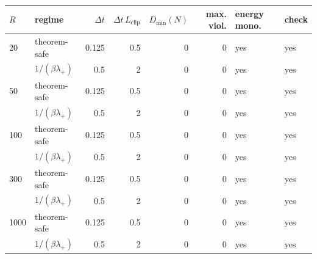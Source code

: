 \begin{tabular}{llrrrrll}
\toprule
$R$ & regime & $\Delta t$ & $\Delta t\,L_{\mathrm{clip}}$ & $D_{\min}(N)$ & max. viol. & energy mono. & check \\
\midrule
20 & theorem-safe & 0.125 & 0.5 & 0 & 0 & yes & yes \\
 & $1/(\beta\lambda_+)$ & 0.5 & 2 & 0 & 0 & yes & yes \\
\midrule
50 & theorem-safe & 0.125 & 0.5 & 0 & 0 & yes & yes \\
 & $1/(\beta\lambda_+)$ & 0.5 & 2 & 0 & 0 & yes & yes \\
\midrule
100 & theorem-safe & 0.125 & 0.5 & 0 & 0 & yes & yes \\
 & $1/(\beta\lambda_+)$ & 0.5 & 2 & 0 & 0 & yes & yes \\
\midrule
300 & theorem-safe & 0.125 & 0.5 & 0 & 0 & yes & yes \\
 & $1/(\beta\lambda_+)$ & 0.5 & 2 & 0 & 0 & yes & yes \\
\midrule
1000 & theorem-safe & 0.125 & 0.5 & 0 & 0 & yes & yes \\
 & $1/(\beta\lambda_+)$ & 0.5 & 2 & 0 & 0 & yes & yes \\
\bottomrule
\end{tabular}
